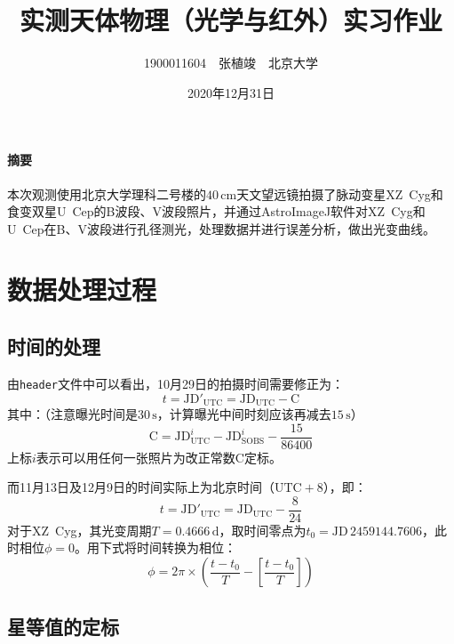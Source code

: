 \documentclass[a4paper,fontset=windows]{ctexart}
\begin{document}
\Large

    \title{\LARGE\textbf{实测天体物理\uppercase\expandafter{}（光学与红外）实习作业}}
    \author{\Large 1900011604\ \ 张植竣\ \ 北京大学}
    \date{\Large 2020年12月31日}

    \maketitle

    \begin{kaishu}
    \paragraph{\Large 摘要}

    本次观测使用北京大学理科二号楼的$40\,\mathrm{cm}$天文望远镜拍摄了脉动变星XZ\ Cyg和食变双星U\ Cep的B波段、V波段照片，并通过AstroImageJ软件对XZ\ Cyg和U\ Cep在B、V波段进行孔径测光，处理数据并进行误差分析，做出光变曲线。
    \end{kaishu}

    \section*{\LARGE 数据处理过程}

    \subsection*{\Large 时间的处理}

    由\texttt{\large \large header}文件中可以看出，10月29日的拍摄时间需要修正为：
    \[
    t = \mathrm{JD'_{UTC} = JD_{UTC} - C}
    \]
    其中：（注意曝光时间是$30\,\mathrm{s}$，计算曝光中间时刻应该再减去$15\,\mathrm{s}$）
    \[
    \mathrm{C = JD_{UTC}^\mathit{i} - JD_{SOBS}^\mathit{i} - \frac{15}{86400}}
    \]
    上标$i$表示可以用任何一张照片为改正常数C定标。

    而11月13日及12月9日的时间实际上为北京时间（$\mathrm{UTC+8}$），即：
    \[
    t = \mathrm{JD'_{UTC} = JD_{UTC} - \frac{8}{24}}
    \]
    对于XZ\ Cyg，其光变周期$T = 0.4666\,\mathrm{d}$，取时间零点为$t_0 = \mathrm{JD\,2459144.7606}$，此时相位$\phi = 0$。用下式将时间转换为相位：
    \[
    \phi = 2\pi \times \left(\frac{t-t_0}{T} - \left[\frac{t-t_0}{T}\right]\right)
    \]

    \subsection*{\Large 星等值的定标}
\end{document}
